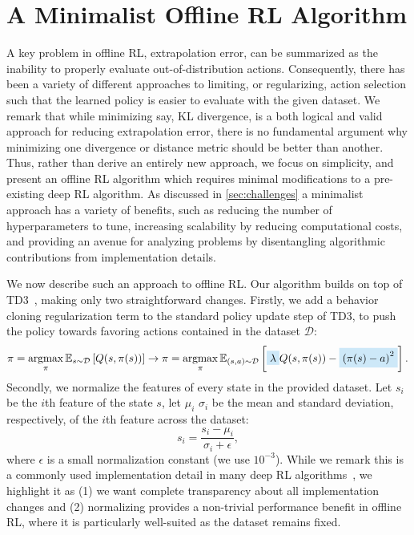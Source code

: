 \documentclass{article}
\newcommand{\e}{\epsilon}
\newcommand{\E}{\mathbb{E}}
\newcommand{\lb}{\left [}
\newcommand{\rb}{\right ]}
\newcommand{\lp}{\left (}
\newcommand{\rp}{\right )}
\DeclareMathOperator*{\argmax}{argmax}
\begin{document}
\section{A Minimalist Offline RL Algorithm}

A key problem in offline RL, extrapolation error, can be summarized as the inability to properly evaluate out-of-distribution actions. Consequently, there has been a variety of different approaches to limiting, or regularizing, action selection such that the learned policy is easier to evaluate with the given dataset. We remark that while minimizing say, KL divergence, is a both logical and valid approach for reducing extrapolation error, there is no fundamental argument why minimizing one divergence or distance metric should be better than another. Thus, rather than derive an entirely new approach, we focus on simplicity, and present an offline RL algorithm which requires minimal modifications to a pre-existing deep RL algorithm. As discussed in \autoref{sec:challenges} a minimalist approach has a variety of benefits, such as reducing the number of hyperparameters to tune, increasing scalability by reducing computational costs, and providing an avenue for analyzing problems by disentangling algorithmic contributions from implementation details. 

We now describe such an approach to offline RL. Our algorithm builds on top of TD3~\citep{fujimoto2018addressing}, making only two straightforward changes. 
Firstly, we add a behavior cloning regularization term to the standard policy update step of TD3, to push the policy towards favoring actions contained in the dataset $\mathcal{D}$:
\begin{equation} \label{eqn:changemain}
    \pi = \argmax_\pi \E_{s \sim \mathcal{D}} \lb Q(s,\pi(s)) \rb \rightarrow \pi = \argmax_\pi \E_{(s,a) \sim \mathcal{D}} \lb \colorbox{mine}{$\lambda$} Q(s,\pi(s)) - \colorbox{mine}{$\lp \pi(s) - a \rp^2$} \rb.
\end{equation}
Secondly, we normalize the features of every state in the provided dataset. Let $s_i$ be the $i$th feature of the state $s$, let $\mu_i$ $\sigma_i$ be the mean and standard deviation, respectively, of the $i$th feature across the dataset:
\begin{equation} \label{eqn:changenorm}
    s_i = \frac{s_i - \mu_i}{\sigma_i + \e}, 
\end{equation}
where $\e$ is a small normalization constant (we use $10^{-3}$). While we remark this is a commonly used implementation detail in many deep RL algorithms~\citep{stable-baselines3}, we highlight it as (1) we want complete transparency about all implementation changes and (2) normalizing provides a non-trivial performance benefit in offline RL, where it is particularly well-suited as the dataset remains fixed. 
\end{document}
